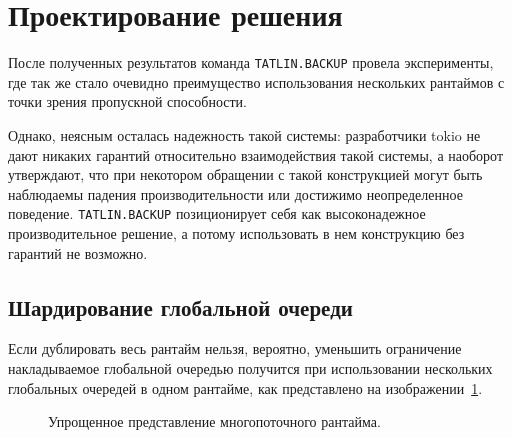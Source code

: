 
\section{Проектирование решения}

После полученных результатов команда \verb|TATLIN.BACKUP| провела эксперименты, где так же стало очевидно преимущество использования нескольких рантаймов с точки зрения пропускной способности.

Однако, неясным осталась надежность такой системы: разработчики tokio не дают никаких гарантий относительно взаимодействия такой системы, а наоборот утверждают, что при некотором обращении с такой конструкцией могут быть наблюдаемы падения производительности или достижимо неопределенное поведение. \verb|TATLIN.BACKUP| позиционирует себя как высоконадежное производительное решение, а потому использовать в нем конструкцию без гарантий не возможно.

\subsection{Шардирование глобальной очереди}

Если дублировать весь рантайм нельзя, вероятно, уменьшить ограничение накладываемое глобальной очередью получится при использовании нескольких глобальных очередей в одном рантайме, как представлено на изображении~\ref{fig:tokio:duplicated_arch}.

\begin{figure}[H]
    \begin{center}
    \end{center}

    \caption{Упрощенное представление многопоточного рантайма.}
    \label{fig:tokio:duplicated_arch}
\end{figure}

